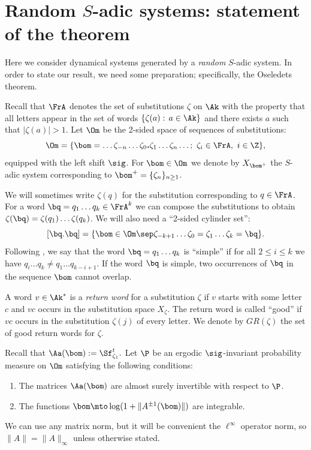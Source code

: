 \section{Random \texorpdfstring{$S$}{S}-adic systems: statement of the theorem}\label{sec:3}

Here we consider dynamical systems generated by a \emph{random} $S$-adic system. In order to state our result, we need some preparation; specifically, the Oseledets theorem.

Recall that $\FrA$ denotes the set of substitutions $\zeta$ on $\Ak$ with the property that all letters appear in the set of words $\{\zeta(a):\,a\in \Ak\}$ and there exists $a$ such that $|\zeta(a)|>1$.
Let $\Om$ be the 2-sided space of sequences of substitutions:
\[
\Om = \{\bom = \ldots \zeta_{-n}\ldots\zeta_0{\text{\bf .}}\zeta_1\ldots \zeta_n\ldots;\ \zeta_i \in \FrA,\ i\in \Z\},
\]
equipped with the left shift $\sig$.
For $\bom\in\Om$ we denote by $X_{\bom^+}$ the $S$-adic system corresponding to $\bom^+=\{\zeta_n\}_{n\ge 1}$.

We will sometimes write $\zeta(q)$ for the substitution corresponding to $q\in \FrA$. For a word $\bq = q_1\ldots q_k\in \FrA^k$ we can compose the substitutions to obtain
$\zeta(\bq) = \zeta(q_1)\ldots \zeta(q_k)$.
We will also need a ``2-sided cylinder set'':\vspace*{-3pt}
\[
[\bq.\bq] = \{\bom\in \Om\sep \zeta_{-k+1}\ldots\zeta_0 = \zeta_1\ldots\zeta_k = \bq\}.
\]
Following \cite{BufGur}, we say that the word $\bq = q_1\ldots q_k$ is ``simple'' if for all $2 \le i \le k$ we have $q_i\ldots q_k \ne q_1\ldots q_{k-i+1}$. If the word $\bq$ is simple, two occurrences of $\bq$ in the sequence
$\bom$ cannot overlap.

\begin{defi}
A word $v\in \Ak^*$ is a \emph{return word} for a substitution $\zeta$ if $v$ starts with some letter $c$ and $vc$ occurs in the substitution space $X_\zeta$. The return word is called ``good'' if $vc$ occurs in the substitution $\zeta(j)$ of every letter. We denote by $GR(\zeta)$ the set of good return words for $\zeta$.
\end{defi}

Recall that
$
\Aa(\bom) := \Sf^t_{\zeta_1}.
$
Let $\P$ be an ergodic $\sig$-invariant probability measure on $\Om$ satisfying the following conditions:
\begin{enumerate}\renewcommand{\theenumi}{C\arabic{enumi}}
\item\label{C1}
The matrices $\Aa(\bom)$ are almost surely invertible with respect to $\P$.

\item\label{C2}
The functions $\bom\mto \log(1+ \|A^{\pm 1}(\bom)\|)$ are integrable.
\end{enumerate}
We can use any matrix norm, but it will be convenient the $\ell^\infty$ operator norm, so
$\|A\|=\|A\|_\infty$ unless otherwise stated.

